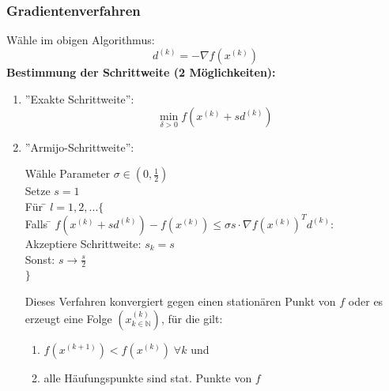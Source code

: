 \documentclass[4pt,a4paper]{scrartcl}
\begin{document}
\begin{multicols}{4}
\subsubsection{Gradientenverfahren}
Wähle im obigen Algorithmus:
\begin{equation*}
d^{(k)}=-\nabla f\left(x^{(k)}\right)
\end{equation*}
\textbf{Bestimmung der Schrittweite (2 Möglichkeiten):}
\begin{enumerate}
\item ''Exakte Schrittweite'':
\begin{equation*}
\min\limits_{\delta>0}f\left(x^{(k)}+sd^{(k)}\right)
\end{equation*}
\item ''Armijo-Schrittweite'':\\
\begin{tabbing}
Wähle Parameter $\sigma\in\left(0,\frac{1}{2}\right)$\\
Setze $s=1$\\
Für \= $l=1,2,...\{$\\
\> Falls \= $f\left(x^{(k)}+sd^{(k)}\right)-f\left(x^{(k)}\right) \leq\sigma s\cdot \nabla f\left(x^{(k)}\right)^Td^{(k)}$:\\
\>\> Akzeptiere Schrittweite: $s_k=s$\\
\> Sonst: $s\rightarrow \frac{s}{2}$\\
$\}$
\end{tabbing}
\vspace{0.2cm}
Dieses Verfahren konvergiert gegen einen stationären Punkt von $f$ oder es erzeugt eine Folge $\left(x^{(k)}_{k\in\mathbb{N}}\right)$, für die gilt:
\begin{enumerate}[label=$\bullet$]
\item $f\left(x^{(k+1)}\right)<f\left(x^{(k)}\right)\;\forall k$ und
\item alle Häufungspunkte sind stat. Punkte von $f$
\end{enumerate}
\end{enumerate}


\end{multicols}
\end{document}
